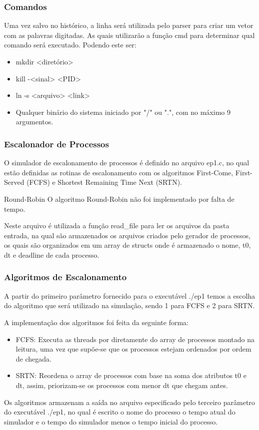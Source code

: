 \documentclass{beamer}
\begin{document}
\begin{frame}
\frametitle{Comandos}

Uma vez salvo no histórico, a linha será utilizada pelo parser para criar um vetor com as palavras digitadas. As quais
utilizarão a função cmd para determinar qual comando será executado. Podendo este ser:

\begin{itemize}
    \item mkdir <diretório>
    \item kill -<sinal> <PID>
    \item ln -s <arquivo> <link>
    \item Qualquer binário do sistema iniciado por "/" ou ".", com no máximo 9 argumentos.
\end{itemize}
\end{frame}

\begin{frame}
\frametitle{Escalonador de Processos}
O simulador de escalonamento de processos é definido no arquivo ep1.c, no qual estão definidas as rotinas de
    escalonamento com os algoritmos First-Come, First-Served (FCFS) e Shortest Remaining Time Next (SRTN).

\begin{block}{Round-Robin}
O algoritmo Round-Robin não foi implementado por falta de tempo.
\end{block}

Neste arquivo é utilizada a função read\_file para ler os arquivos da pasta entrada, na qual são armazenados os arquivos
criados pelo gerador de processos, os quais são organizados em um array de structs onde é armazenado o nome, t0, dt e
    deadline de cada processo.
\end{frame}

\begin{frame}
\frametitle{Algoritmos de Escalonamento}
A partir do primeiro parâmetro fornecido para o executável ./ep1 temos a escolha do algoritmo que será utilizado na
    simulação, sendo 1 para FCFS e 2 para SRTN.

A implementação dos algoritmos foi feita da seguinte forma:
\begin{itemize}
    \item FCFS: Executa as threads por diretamente do array de processos montado na leitura, uma vez que supõe-se que os
        processos estejam ordenados por ordem de chegada.
    \item SRTN: Reordena o array de processos com base na soma dos atributos t0 e dt, assim, priorizam-se os processos
        com menor dt que chegam antes.
\end{itemize}

Os algoritmos armazenam a saída no arquivo especificado pelo terceiro parâmetro do executável ./ep1, no qual é escrito o
nome do processo o tempo atual do simulador e o tempo do simulador menos o tempo inicial do processo.

\end{frame}
\end{document}
